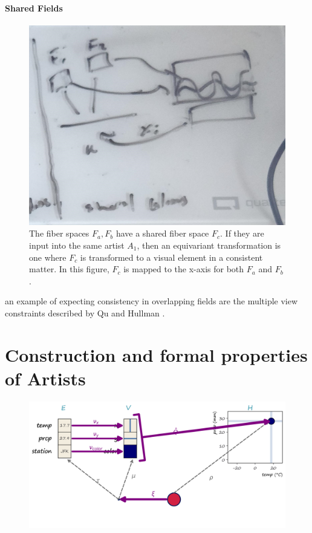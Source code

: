 \documentclass[10pt,journal,compsoc]{IEEEtran}
\theoremstyle{definition}
\theoremstyle{remark}
\begin{document}
\paragraph{Shared Fields}

\begin{figure}[h!]
  \includegraphics[width=\columnwidth]{intersection_f.png}
  \caption{The fiber spaces $F_a, F_b$ have a shared fiber space $F_c$. If they are input into the same artist $A_1$, then an equivariant transformation is one where $F_c$ is transformed to a visual element in a consistent matter. In this figure, $F_c$ is mapped to the x-axis for both $F_a$ and $F_b$.}
  \label{fig:artist:compose:union_fiber}
\end{figure}
an example of expecting consistency in overlapping fields are the multiple view constraints described by Qu and Hullman \cite{hullmanKeeping2018}. 


\section{Construction and formal properties of Artists}
\label{sec:artist:construction}
\begin{figure}[h!]
  \includegraphics[width=\linewidth]{q.png}
  \caption{}
  \label{fig:constraints:q-overall}
\end{figure}
\end{document}
